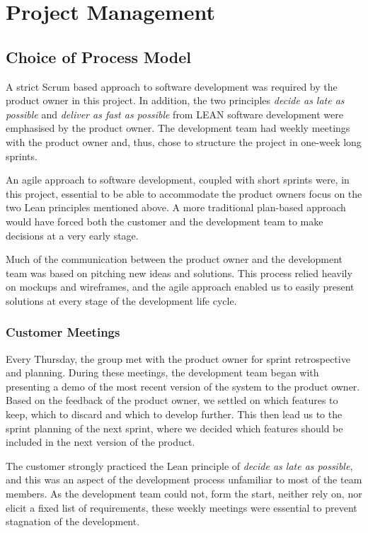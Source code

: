 \chapter{Project Management}


\section{Choice of Process Model}
A strict Scrum based approach to software development was required by the product owner in this project. In addition, the two principles \textit{decide as late as possible} and \textit{deliver as fast as possible}  from  LEAN software development were emphasised by the product owner. The development team had weekly meetings with the product owner and, thus, chose to structure the project in one-week long sprints. 

An agile approach to software development, coupled with short sprints were, in this project, essential to be able to accommodate the product owners focus on the two Lean principles mentioned above. A more traditional plan-based approach would have forced both the customer and the development team to make decisions at a very early stage. 

Much of the communication between the product owner and the development team was based on pitching new ideas and solutions. This process relied heavily on mockups and wireframes, and the agile approach enabled us to easily present solutions at every stage of the development life cycle.


\subsection{Customer Meetings}
Every Thursday, the group met with the product owner for sprint retrospective and planning. During these meetings, the development team began with presenting a demo of the most recent version of the system to the product owner. Based on the feedback of the product owner, we settled on which features to keep, which to discard and which to develop further. This then lead us to the sprint planning of the next sprint, where we decided which features should be included in the next version of the product. 

The customer strongly practiced the Lean principle of \textit{decide as late as possible}, and this was an aspect of the development process unfamiliar to most of the team members. As the development team could not, form the start, neither rely on, nor elicit a fixed list of requirements, these weekly meetings were essential to prevent stagnation of the development. 

